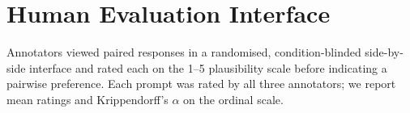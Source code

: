 \documentclass[11pt]{article}
\begin{document}
\section{Human Evaluation Interface}
\label{sec:appendix-human}

Annotators viewed paired responses in a randomised, condition-blinded
side-by-side interface and rated each on the 1--5 plausibility scale
before indicating a pairwise preference. Each prompt was rated by all
three annotators; we report mean ratings and Krippendorff's $\alpha$
on the ordinal scale.
\end{document}
